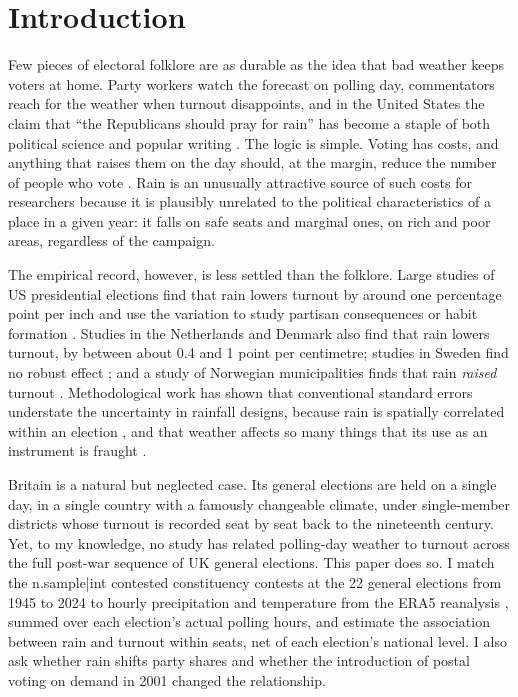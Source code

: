 \documentclass[11pt,a4paper]{article}
\begin{document}
\section{Introduction}
Few pieces of electoral folklore are as durable as the idea that bad weather keeps voters at home. Party workers watch the forecast on polling day, commentators reach for the weather when turnout disappoints, and in the United States the claim that ``the Republicans should pray for rain'' has become a staple of both political science and popular writing \citep{gomez2007}. The logic is simple. Voting has costs, and anything that raises them on the day should, at the margin, reduce the number of people who vote \citep{downs1957,rikerordeshook1968}. Rain is an unusually attractive source of such costs for researchers because it is plausibly unrelated to the political characteristics of a place in a given year: it falls on safe seats and marginal ones, on rich and poor areas, regardless of the campaign.

The empirical record, however, is less settled than the folklore. Large studies of US presidential elections find that rain lowers turnout by around one percentage point per inch \citep{gomez2007} and use the variation to study partisan consequences \citep{hansfordgomez2010} or habit formation \citep{fujiwara2016}. Studies in the Netherlands \citep{eisinga2012turnout} and Denmark \citep{damsbo2023} also find that rain lowers turnout, by between about 0.4 and 1 point per centimetre; studies in Sweden find no robust effect \citep{persson2014}; and a study of Norwegian municipalities finds that rain \emph{raised} turnout \citep{lind2020}. Methodological work has shown that conventional standard errors understate the uncertainty in rainfall designs, because rain is spatially correlated within an election \citep{cooperman2017}, and that weather affects so many things that its use as an instrument is fraught \citep{mellon2025}.

Britain is a natural but neglected case. Its general elections are held on a single day, in a single country with a famously changeable climate, under single-member districts whose turnout is recorded seat by seat back to the nineteenth century. Yet, to my knowledge, no study has related polling-day weather to turnout across the full post-war sequence of UK general elections. This paper does so. I match the {{n.sample|int}} contested constituency contests at the 22 general elections from 1945 to 2024 to hourly precipitation and temperature from the ERA5 reanalysis \citep{hersbach2020}, summed over each election's actual polling hours, and estimate the association between rain and turnout within seats, net of each election's national level. I also ask whether rain shifts party shares and whether the introduction of postal voting on demand in 2001 changed the relationship.
\end{document}
